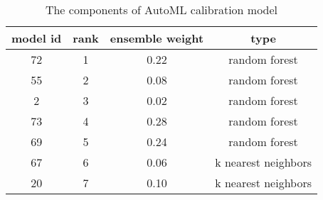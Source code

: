 \begin{table}[htb]
  \caption{The components of AutoML calibration model}
  \label{tbl:xrs1}
    \begin{center}
      \begin{tabular}{cccc}
        \hline
        \textbf{model id} & \textbf{rank} & \textbf{ensemble weight} & \textbf{type}       \\ \hline
        72                & 1             & 0.22                     & random forest       \\
        55                & 2             & 0.08                     & random forest       \\
        2                 & 3             & 0.02                     & random forest       \\
        73                & 4             & 0.28                     & random forest       \\
        69                & 5             & 0.24                     & random forest       \\
        67                & 6             & 0.06                     & k nearest neighbors \\
        20                & 7             & 0.10                     & k nearest neighbors \\ \hline
        \end{tabular}
    \end{center}
\end{table}